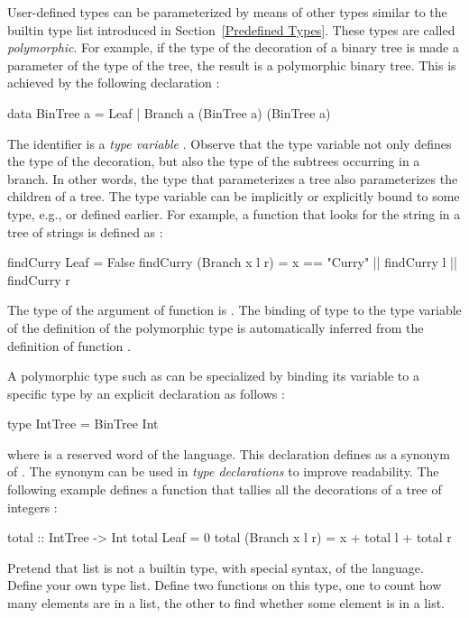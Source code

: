 User-defined types can be parameterized by means
of other types similar to the builtin type list
introduced in Section~\ref{Predefined Types}.
These types are called \emph{polymorphic}.
For example, if the type of the decoration of a binary tree
is made a parameter of the type of the tree, 
the result is a polymorphic binary tree.
This is achieved by the following declaration
:
%
\begin{curry}
data BinTree a = Leaf | Branch a (BinTree a) (BinTree a)
\end{curry}
%
The identifier  is a \emph{type variable}%
.
Observe that the type variable not only defines the type of the
decoration, but also the type of the subtrees occurring in a branch.
In other words, the type that parameterizes a tree also
parameterizes the children of a tree.
The type variable can be implicitly or explicitly 
bound to some type, e.g., 
or  defined earlier.
For example, a function that looks for the string 
in a tree of strings is defined as
:
%
\begin{curry}
findCurry Leaf           = False
findCurry (Branch x l r) = x == "Curry" || findCurry l || findCurry r
\end{curry}
%
The type of the argument of function  is
.
The binding of type  to the type variable
of the definition of the polymorphic type 
is automatically inferred from the definition of function
.

A polymorphic type such as  can be specialized
by binding its variable to a specific type by an explicit declaration
as follows
:
%
\begin{curry}
type IntTree = BinTree Int
\end{curry}
%
where  is a reserved word of the language.
This declaration defines  as a synonym
of .
The synonym can be used in \emph{type declarations}
to improve readability.
The following example defines a function that tallies
all the decorations of a tree of integers
:
%
\begin{curry}
total :: IntTree -> Int
total Leaf           = 0
total (Branch x l r) = x + total l + total r
\end{curry}
%
\begin{exercise}
\label{ex_userlist}
Pretend that list is not a builtin type, with
special syntax, of the language.
Define your own type list.
Define two functions on this type,
one to count how many elements are in a list,
the other to find whether some element is in a list.
\end{exercise}

